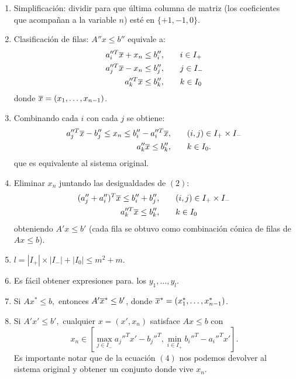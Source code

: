\begin{enumerate}
    \item Simplificación: dividir para que última columna de matriz (los coeficientes que acompañan a la variable $n$) esté en $\{+1, -1, 0\}$.
    \item Clasificación de filas: $A''x \le b''$ equivale a:
        \begin{align*}
        a_i''^T\overline{x} + x_n \le b_i'', & \qquad i \in I_+\\
        a_j''^T\overline{x} - x_n \le b_j'', & \qquad j \in I_-\\
        a_k''^T\overline{x} \le b_k'',       & \qquad k \in I_0\\
        \end{align*}
        donde $\overline{x}=(x_1,\ldots,x_{n-1})$.
    \item Combinando cada $i$ con cada $j$ se obtiene:
        \begin{align}
            a_j''^T\overline{x} - b_j'' \le x_n \le b_i''-a_i''^T\overline{x}, & \qquad (i,j) \in I_+ \times I_-\\
            a_k''\overline{x} \le b_k'', & \qquad k \in I_0.
        \end{align}
        que es equivalente al sistema original.
    \item Eliminar $x_n$ juntando las desigualdades de $(2)$:
        \begin{align*}
            (a_j''+a_i'')^T\overline{x} \le b_i'' + b_j'', & \qquad (i,j) \in I_+ \times I_-\\
            a_k''^T\overline{x} \le b_k'', & \qquad k \in I_0
        \end{align*}
        obteniendo $A'x\le b'$ (cada fila se obtuvo como combinación cónica de filas de $Ax\le b$).
    \item $l = |I_+| \times |I_-| + |I_0| \le m^2 + m$.
    \item Es fácil obtener expresiones para. los $y_1,\ldots,y_l$.
    \item Si $Ax^*\le b,$ entonces $A'\overline{x}^* \le b'$, donde $\overline{x}^*=(x^*_1,\ldots,x^*_{n-1})$.
    \item Si $A'x' \le b',$ cualquier $x=(x',x_n)$ satisface $Ax\le b$ con
        \begin{equation}
            x_n\in \left[ \max_{j\in I_-} a_j''^T x'-b_j''^T, \min_{i \in I_+} b_i''^T-a_i''^Tx'\right].
        \end{equation}
        Es importante notar que de la ecuación $(4)$ nos podemos devolver al sistema original y obtener un conjunto donde vive $x_n$.
\end{enumerate}

